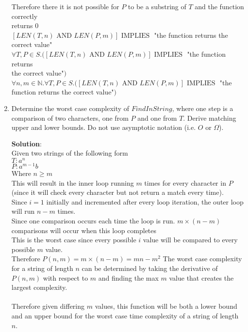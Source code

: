 \documentclass[11pt]{article}
\def\nats {{\mathbb N}}
\newcommand{\Implies}{\mbox{ IMPLIES }}
\newcommand{\And}{\mbox{ AND }}
\begin{document}
\begin{enumerate}
\begin{solution}
\null\qquad\quad Therefore there it is not possible for $P$ to be a substring of $T$ and the function correctly \\
\null\qquad\quad returns $0$\\
\null\qquad  $[LEN(T, n)\And LEN(P, m)]\Implies$ "the function returns the correct value"\\
\null\quad $\forall T, P \in S.([LEN(T, n)\And LEN(P, m)]\Implies$ "the function returns \\
\null\quad the correct value"$)$\\
$\forall n,m\in\nats.\forall T, P \in S.([LEN(T, n)\And LEN(P, m)]\Implies$ "the function returns the correct value"$)$\\
\end{solution}

\item
\begin{question}
Determine the worst case complexity of $FindInString$,
where one step is a comparison of two characters, one from
$P$ and one from $T$.
Derive matching upper and lower bounds.
Do not use asymptotic notation (i.e. $O$ or $\Omega$).
\end{question}

\begin{solution}
{\bf Solution}:\\
Given two strings of the following form\\
$T:a^n$\\
$P: a^{m-1}b$ \\
Where $n \ge m$\\
This will result in the inner loop running $m$ times for every character in $P$ (since it will check every character but not return a match every time).\\
Since $i=1$ initially and incremented after every loop iteration, the outer loop will run $n-m$ times.\\
Since one comparison occurs each time the loop is run. $m\times(n-m)$ comparisons will occur when this loop completes\\
This is the worst case since every possible $i$ value will be compared to every possible $m$ value.\\
Therefore $P(n,m) = m\times(n-m) = mn- m^2$
The worst case complexity for a string of length $n$ can be determined by taking the derivative of $P(n, m)$ with respect to $m$ and
finding the max $m$ value that creates the largest complexity.\\\\
Therefore given differing $m$ values, this function will be both a lower bound and an upper bound for the worst case time complexity of a string of length $n$.\\


\end{solution}
\end{enumerate}
\end{document}
